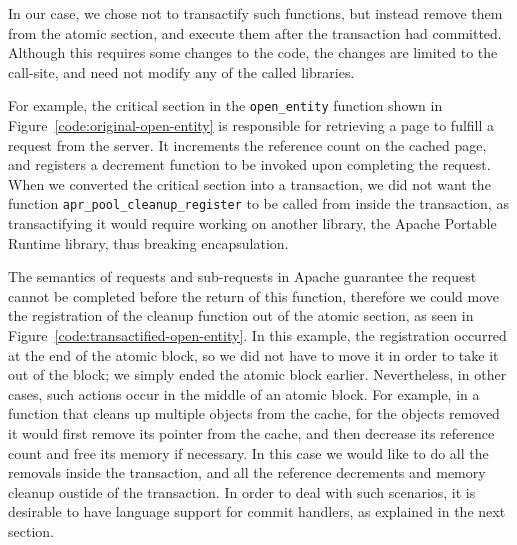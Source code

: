 \documentclass[11pt]{sigplanconf}
\begin{document}
In our case, we chose not to transactify such functions, but instead remove them
from the atomic section, and execute them after the transaction had committed.
Although this requires some changes to the code, the changes are limited to the
call-site, and need not modify any of the called libraries.

For example, the  critical section in the {\tt open\_entity} function
shown in Figure~\ref{code:original-open-entity}
 is responsible for retrieving a page
to fulfill a request from the server. It  increments the reference count on
the cached page, and registers a decrement function to be invoked upon completing
the request. When we converted the critical section into a transaction, we
did not want the function {\tt apr\_pool\_cleanup\_register} to be called from
inside the transaction, as transactifying it would require working on another
library, the Apache Portable Runtime library, thus breaking encapsulation.

The semantics of requests and sub-requests in Apache guarantee the request
cannot be completed before the return of this function, therefore we could
move the registration of the cleanup function out of the atomic section, as 
seen in Figure~\ref{code:transactified-open-entity}. In this example, 
the registration occurred at the end of the atomic block, so 
we did not have to move it in order to take it out of the block;
we simply ended the atomic block earlier. Nevertheless, in other cases,
such actions occur in the middle of an atomic block. For example, in a function
that cleans up multiple objects from the cache, for the objects removed it
would first remove its pointer from the cache, and then decrease its reference
count and free its memory if necessary. In this case we would like to do all the
removals inside the transaction, and all the reference decrements and memory
cleanup oustide of the transaction. In order to deal with such scenarios, it is
desirable to have language support for commit handlers, as explained in the next
section. 
\end{document}
